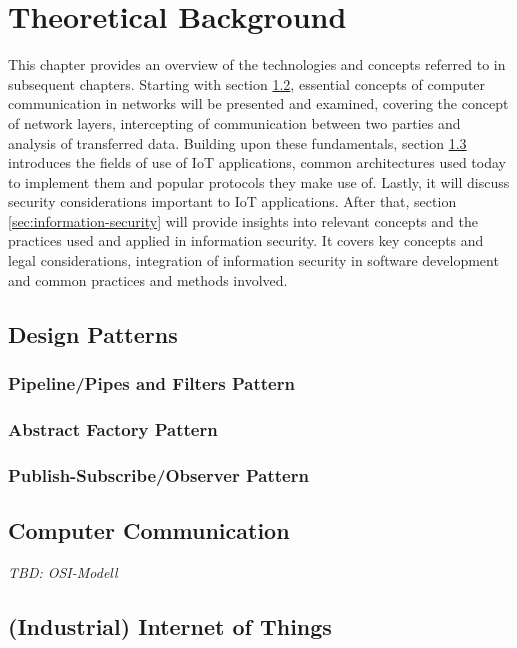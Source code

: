 \chapter{Theoretical Background}
\label{chap:theoretical-background}
This chapter provides an overview of the technologies and concepts referred to in subsequent chapters.
Starting with section \ref{sec:computer-networks}, essential concepts of computer communication in networks will be presented and examined, covering the concept of network layers, intercepting of communication between two parties and analysis of transferred data.
Building upon these fundamentals, section \ref{sec:internet-of-things} introduces the fields of use of \ac{IoT} applications, common architectures used today to implement them and popular protocols they make use of. Lastly, it will discuss security considerations important to \ac{IoT} applications.
After that, section \ref{sec:information-security} will provide insights into relevant concepts and the practices used and applied in information security. It covers key concepts and legal considerations, integration of information security in software development and common practices and methods involved.


\section{Design Patterns}
\subsection{Pipeline/Pipes and Filters Pattern}
\subsection{Abstract Factory Pattern}
\subsection{Publish-Subscribe/Observer Pattern}

\section{Computer Communication}
\label{sec:computer-networks}
\emph{TBD: OSI-Modell} %

\section{(Industrial) Internet of Things}
\label{sec:internet-of-things}
